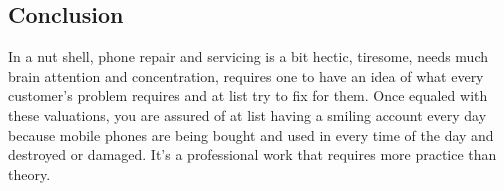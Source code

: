 \documentclass[12pt,letterpaper]{article}
\begin{document}
 \subsection{Conclusion}
 
 In a nut shell, phone repair and servicing is a bit hectic, tiresome, needs much brain attention and concentration, requires one to have an idea of what every customer's problem requires and at list try to fix for them. Once equaled with these valuations, you are assured of at list having a smiling account every day because mobile phones are being bought and used in every time of the day and destroyed or damaged. It's a professional work that requires more practice than theory.
 
\end{document}
